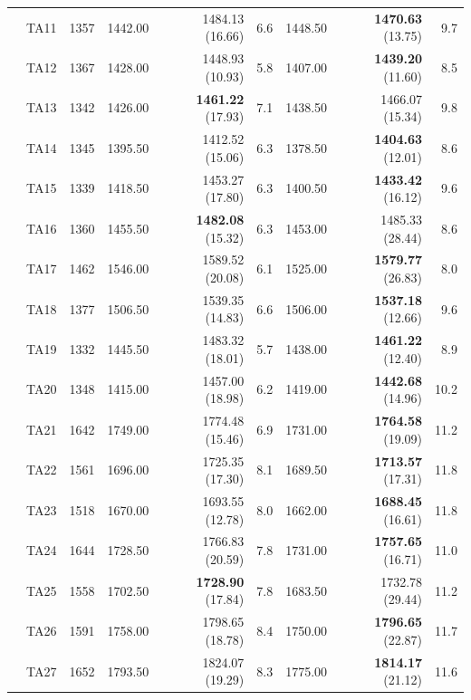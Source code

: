 \documentclass[icae]{iosart2x}
\begin{document}
\begin{appendix}
\begin{table}[htb]
\begin{tabular}{c|c|c|rrr|rrr}
\midrule
\parbox[t]{2mm}{}
 & TA11 & 1357 & 1442.00 & 1484.13 \tiny{(16.66)} & 6.6 & 1448.50 & \textbf{1470.63} \tiny{(13.75)} & 9.7\\
 & TA12 & 1367 & 1428.00 & 1448.93 \tiny{(10.93)} & 5.8 & 1407.00 & \textbf{1439.20} \tiny{(11.60)} & 8.5\\
 & TA13 & 1342 & 1426.00 & \textbf{1461.22} \tiny{(17.93)} & 7.1 & 1438.50 & 1466.07 \tiny{(15.34)} & 9.8\\
 & TA14 & 1345 & 1395.50 & 1412.52 \tiny{(15.06)} & 6.3 & 1378.50 & \textbf{1404.63} \tiny{(12.01)} & 8.6\\
 & TA15 & 1339 & 1418.50 & 1453.27 \tiny{(17.80)} & 6.3 & 1400.50 & \textbf{1433.42} \tiny{(16.12)} & 9.6\\
 & TA16 & 1360 & 1455.50 & \textbf{1482.08} \tiny{(15.32)} & 6.3 & 1453.00 & 1485.33 \tiny{(28.44)} & 8.6\\
 & TA17 & 1462 & 1546.00 & 1589.52 \tiny{(20.08)} & 6.1 & 1525.00 & \textbf{1579.77} \tiny{(26.83)} & 8.0\\
 & TA18 & 1377 & 1506.50 & 1539.35 \tiny{(14.83)} & 6.6 & 1506.00 & \textbf{1537.18} \tiny{(12.66)} & 9.6\\
 & TA19 & 1332 & 1445.50 & 1483.32 \tiny{(18.01)} & 5.7 & 1438.00 & \textbf{1461.22} \tiny{(12.40)} & 8.9\\
 & TA20 & 1348 & 1415.00 & 1457.00 \tiny{(18.98)} & 6.2 & 1419.00 & \textbf{1442.68} \tiny{(14.96)} & 10.2\\
\midrule
\parbox[t]{2mm}{}
 & TA21 & 1642 & 1749.00 & 1774.48 \tiny{(15.46)} & 6.9 & 1731.00 & \textbf{1764.58} \tiny{(19.09)} & 11.2\\
 & TA22 & 1561 & 1696.00 & 1725.35 \tiny{(17.30)} & 8.1 & 1689.50 & \textbf{1713.57} \tiny{(17.31)} & 11.8\\
 & TA23 & 1518 & 1670.00 & 1693.55 \tiny{(12.78)} & 8.0 & 1662.00 & \textbf{1688.45} \tiny{(16.61)} & 11.8\\
 & TA24 & 1644 & 1728.50 & 1766.83 \tiny{(20.59)} & 7.8 & 1731.00 & \textbf{1757.65} \tiny{(16.71)} & 11.0\\
 & TA25 & 1558 & 1702.50 & \textbf{1728.90} \tiny{(17.84)} & 7.8 & 1683.50 & 1732.78 \tiny{(29.44)} & 11.2\\
 & TA26 & 1591 & 1758.00 & 1798.65 \tiny{(18.78)} & 8.4 & 1750.00 & \textbf{1796.65} \tiny{(22.87)} & 11.7\\
 & TA27 & 1652 & 1793.50 & 1824.07 \tiny{(19.29)} & 8.3 & 1775.00 & \textbf{1814.17} \tiny{(21.12)} & 11.6\\

\end{tabular}
\end{table}
\end{appendix}
\end{document}
